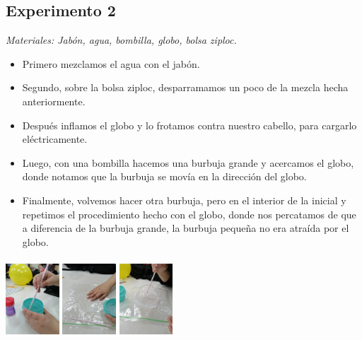 \documentclass[]{article}
\newenvironment{Figura}
  {\par\medskip\noindent\minipage{\linewidth}}
  {\endminipage\par\medskip}
\begin{document}
\begin{multicols*}{2}




\section*{Experimento 2}
\textit{Materiales: Jabón, agua, bombilla, globo, bolsa ziploc.}

\vspace{-\topsep}
\begin{itemize}
    \setlength{\parskip}{0pt} 
    \setlength{\itemsep}{0pt plus 1pt}
    \item Primero mezclamos el agua con el jabón.
    \item Segundo, sobre la bolsa ziploc, desparramamos un poco de la mezcla hecha anteriormente.
    \item Después inflamos el globo y lo frotamos contra nuestro cabello, para cargarlo eléctricamente.
    \item Luego, con una bombilla hacemos una burbuja grande y acercamos el globo, donde notamos que la burbuja se movía en la dirección del globo.
    \item Finalmente, volvemos hacer otra burbuja, pero en el interior de la inicial y repetimos el procedimiento hecho con el globo, donde nos percatamos de que a diferencia
    de la burbuja grande, la burbuja pequeña no era atraída por el globo.
\end{itemize}
\vspace{-\topsep}



\begin{Figura}
    \centering
    \includegraphics[width=2cm, height=3cm]{imag/Exp2_00.jpg}
    \includegraphics[width=2cm, height=3cm]{imag/Exp2_01.jpg}
    \includegraphics[width=2cm, height=3cm]{imag/Exp2_02.jpg}
\end{Figura}  


\end{multicols*}
\end{document}
